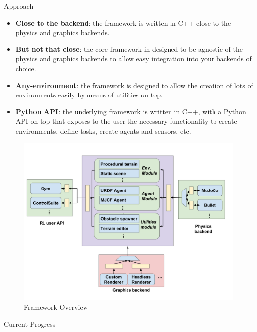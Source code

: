 \documentclass[final]{beamer}
\newlength{\onecolwid}
\begin{document}
\begin{frame}[t]
\begin{columns}[t]
\begin{column}{\onecolwid} %

\begin{block}{Approach}

    \begin{itemize}
        \item \textbf{Close to the backend}: the framework is written in C++
                close to the physics and graphics backends.
        \item \textbf{But not that close}: the core framework in designed to be
                agnostic of the physics and graphics backends to allow easy integration
                into your backends of choice.
        \item \textbf{Any-environment}: the framework is designed to allow the
                creation of lots of environments easily by means of utilities on top.
        \item \textbf{Python API}: the underlying framework is written in C++,
                with a Python API on top that exposes to the user the necessary functionality
                to create environments, define tasks, create agents and sensors, etc.
    \end{itemize}

    \begin{figure}
        \includegraphics[width=0.85\linewidth]{_imgs/img_proposed_framework.png}
        \caption{Framework Overview}
    \end{figure}

\end{block}

\begin{block}{Current Progress}


\end{block}
\end{column}
\end{columns}
\end{frame}
\end{document}
